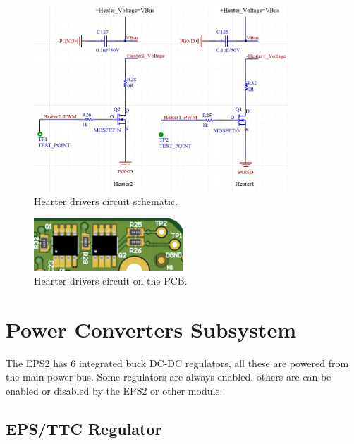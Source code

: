 \begin{figure}[!ht]
    \begin{center}
        \includegraphics[width=0.85\textwidth]{figures/heaters-drivers-circuit-schematic.png}
        \caption{Hearter drivers circuit schematic.}
        \label{fig:heaters-circuit-schematic}
    \end{center}
\end{figure}

\begin{figure}[!ht]
    \begin{center}
        \includegraphics[width=0.5\textwidth]{figures/heaters-drivers-circuit-3d.png}
        \caption{Hearter drivers circuit on the PCB.}
        \label{fig:heaters-drivers-circuit-3d}
    \end{center}
\end{figure}

\section{Power Converters Subsystem}

The EPS2 has 6 integrated buck DC-DC regulators, all these are powered from the main power bus. Some regulators are always enabled, others are can be enabled or disabled by the EPS2 or other module.

\subsection{EPS/TTC Regulator}

